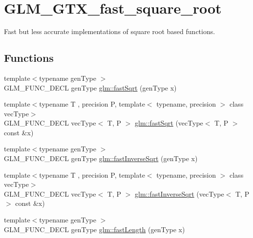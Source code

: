\hypertarget{group__gtx__fast__square__root}{\section{G\-L\-M\-\_\-\-G\-T\-X\-\_\-fast\-\_\-square\-\_\-root}
\label{group__gtx__fast__square__root}
}


Fast but less accurate implementations of square root based functions.  


\subsection*{Functions}
\begin{DoxyCompactItemize}
\item 
{\footnotesize template$<$typename gen\-Type $>$ }\\G\-L\-M\-\_\-\-F\-U\-N\-C\-\_\-\-D\-E\-C\-L gen\-Type \hyperlink{group__gtx__fast__square__root_ga6c460e9414a50b2fc455c8f64c86cdc9}{glm\-::fast\-Sqrt} (gen\-Type x)
\item 
{\footnotesize template$<$typename T , precision P, template$<$ typename, precision $>$ class vec\-Type$>$ }\\G\-L\-M\-\_\-\-F\-U\-N\-C\-\_\-\-D\-E\-C\-L vec\-Type$<$ T, P $>$ \hyperlink{group__gtx__fast__square__root_gaad9f601bbc3faa04dda384e4c4e1592c}{glm\-::fast\-Sqrt} (vec\-Type$<$ T, P $>$ const \&x)
\item 
{\footnotesize template$<$typename gen\-Type $>$ }\\G\-L\-M\-\_\-\-F\-U\-N\-C\-\_\-\-D\-E\-C\-L gen\-Type \hyperlink{group__gtx__fast__square__root_ga7f081b14d9c7035c8714eba5f7f75a8f}{glm\-::fast\-Inverse\-Sqrt} (gen\-Type x)
\item 
{\footnotesize template$<$typename T , precision P, template$<$ typename, precision $>$ class vec\-Type$>$ }\\G\-L\-M\-\_\-\-F\-U\-N\-C\-\_\-\-D\-E\-C\-L vec\-Type$<$ T, P $>$ \hyperlink{group__gtx__fast__square__root_ga903878071f92e51e551791e584a171a1}{glm\-::fast\-Inverse\-Sqrt} (vec\-Type$<$ T, P $>$ const \&x)
\item 
{\footnotesize template$<$typename gen\-Type $>$ }\\G\-L\-M\-\_\-\-F\-U\-N\-C\-\_\-\-D\-E\-C\-L gen\-Type \hyperlink{group__gtx__fast__square__root_gafe697d6287719538346bbdf8b1367c59}{glm\-::fast\-Length} (gen\-Type x)
\item 

\end{DoxyCompactItemize}
